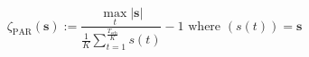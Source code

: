 \begin{equation}
	\zeta_\text{PAR}(\textbf{s}) := \frac{\max_t \left| \textbf{s} \right|}{\frac{1}{K}\sum_{t=1}^{\frac{T_\text{sch}}{K}}{s}(t)} - 1
	\text{ where } ({s}(t)) = \textbf{s}
\label{ch1:equ:peak-to-average-definition}
\end{equation}